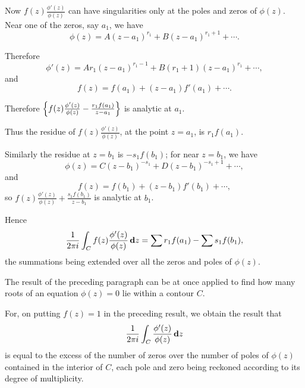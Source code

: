 Now
$f(z) \frac{\phi'(z)}{\phi(z)}$
can have singularities only at the poles and zeros of $\phi(z)$.
Near one of the zeros, say $a_{1}$, we have
$$
\phi(z)
=
A (z-a_{1})^{r_{1}}
+ B (z-a_{1})^{r_{1}+1}
+ \cdots.
$$

Therefore
$$
\phi'(z)
=
A r_{1} (z-a_{1})^{r_{1}-1}
+ B (r_{1}+1) (z-a_{1})^{r_{1}}
+ \cdots,
$$
and
$$
f(z) = f(a_{1}) + (z-a_{1}) f'(a_{1}) + \cdots.
$$

Therefore
$
\left\{ f(z) \frac{\phi'(z)}{\phi(z)}
  -
  \frac{ r_{1} f(a_{1}) }{ z - a_{1} }
 \right\}
$ is analytic at $a_{1}$.

Thus the residue of $f(z) \frac{\phi'(z)}{\phi(z)}$, at the point
$z=a_{1}$, is $r_{1} f(a_{1})$.

Similarly the residue at $z=b_{1}$ is
$-s_{1} f(b_{1})$; for near $z=b_{1}$, we have
$$
\phi(z)
=
C (z-b_{1})^{-s_{1}}
+ D (z-b_{1})^{-s_{1} + 1}
+ \cdots,
$$
and
$$
f(z)
=
f(b_{1})
+ (z - b_{1}) f'(b_{1})
+ \cdots,
$$
so
$
f(z) \frac{ \phi'(z) }{\phi(z)}
+
\frac{ s_{1} f(b_{1}) }{ z-b_{1} }
$
is analytic at $b_{1}$.

Hence
$$
\frac{1}{2\pi i}
\int_{C} f(z) \frac{ \phi'(z) }{\phi(z)} \, \mathbf{d} z
=
\sum r_{1} f(a_{1})
-
\sum s_{1} f(b_{1}),
$$
the summations being extended over all the zeros and poles of
$\phi(z)$.

The result of the preceding paragraph can be at once applied to find
how many roots of an equation $\phi(z) = 0$ lie within a contour $C$.

For, on putting $f(z) = 1$ in the preceding result, we obtain the
result that
$$
\frac{1}{2\pi i}
\int_{C} \frac{ \phi'(z) }{\phi(z)} \, \mathbf{d} z
$$
is equal to the excess of the number of zeros over the number of poles
of $\phi(z)$ contained in the interior of $C$, each pole and zero
being reckoned according to its degree of multiplicity.

